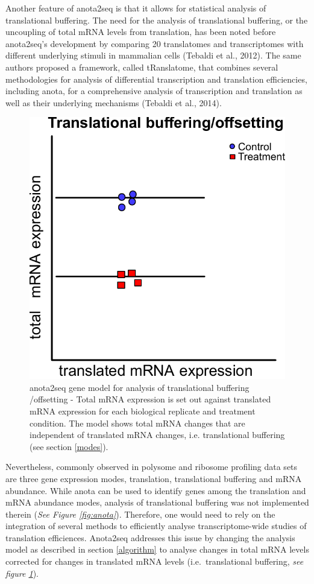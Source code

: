 \documentclass[12pt,openany]{book}
\begin{document}
Another feature of anota2seq is that it allows for statistical analysis
of translational buffering. The need for the analysis of translational
buffering, or the uncoupling of total mRNA levels from translation, has
been noted before anota2seq's development by comparing 20 translatomes
and transcriptomes with different underlying stimuli in mammalian cells
(Tebaldi et al., 2012). The same authors proposed a framework, called
tRanslatome, that combines several methodologies for analysis of
differential transcription and translation efficiencies, including
anota, for a comprehensive analysis of transcription and translation as
well as their underlying mechanisms (Tebaldi et al., 2014).

\begin{figure}
  \includegraphics{./figures/geneModes_anota2seq.pdf}
  \caption{anota2seq gene model for analysis of translational buffering /offsetting - Total mRNA expression is set out against translated mRNA expression for each biological replicate and treatment condition. The model shows total mRNA changes that are independent of translated mRNA changes, i.e. translational buffering (see section \ref{modes}).
  \label{fig:anota2seq}}
\end{figure}

Nevertheless, commonly observed in polysome and ribosome profiling data
sets are three gene expression modes, translation, translational
buffering and mRNA abundance. While anota can be used to identify genes
among the translation and mRNA abundance modes, analysis of
translational buffering was not implemented therein (\emph{See Figure
\ref{fig:anota}}). Therefore, one would need to rely on the integration
of several methods to efficiently analyse transcriptome-wide studies of
translation efficiences. Anota2seq addresses this issue by changing the
analysis model as described in section \ref{algorithm} to analyse
changes in total mRNA levels corrected for changes in translated mRNA
levels (i.e.~translational buffering, \emph{see figure
\ref{fig:anota2seq}}).
\end{document}
